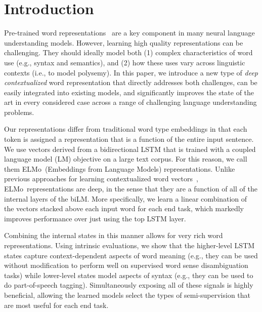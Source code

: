 \documentclass[11pt,a4paper]{article}
\newcommand{\ELMO}{ELMo}
\begin{document}
\section{Introduction}
Pre-trained word representations~\citep{word2vec,Pennington2014GloveGV} are a key component in many neural language understanding models. 
However, learning high quality representations can be challenging.
They should ideally model both (1) complex characteristics of word use (e.g., syntax and semantics), and (2) how these uses vary across linguistic
contexts (i.e., to model polysemy).
In this paper, we introduce a new type of {\em deep contextualized} word representation that directly addresses both challenges, can be easily integrated into existing models, and significantly improves the state of the art in every considered case across a range of challenging language understanding problems.


Our representations differ from traditional word type embeddings in that each token is assigned a representation that is a function of the entire input sentence. We use vectors derived from a bidirectional LSTM that is trained with a coupled language model (LM) objective on a large text corpus. For this reason, we call them \ELMO\ (Embeddings from Language Models) representations. Unlike previous approaches for learning contextualized word vectors~\citep{Peters2017SemisupervisedST,McCann2017LearnedIT}, \ELMO\ representations are deep, in the sense that they are a function of all of the internal layers of the biLM. More specifically, we learn a linear combination of the vectors stacked above each input word for each end task, which markedly improves performance over just using the top LSTM layer.

Combining the internal states in this manner allows for very rich word representations.  Using intrinsic evaluations, we show that the higher-level LSTM states capture context-dependent aspects of word meaning (e.g., they can be used without modification to perform well on supervised word sense disambiguation tasks) while lower-level states model aspects of syntax (e.g., they can be used to do part-of-speech tagging). Simultaneously exposing all of these signals is highly beneficial, allowing the learned models select the types of semi-supervision that are most useful for each end task. 
\end{document}
